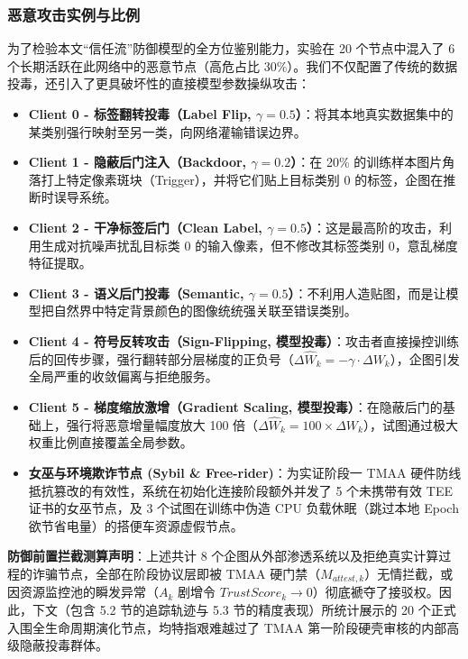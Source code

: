 \documentclass[11pt, a4paper, UTF8, fontset=fandol]{ctexart}
\begin{document}
\subsubsection{恶意攻击实例与比例}
为了检验本文“信任流”防御模型的全方位鉴别能力，实验在 20 个节点中混入了 6 个长期活跃在此网络中的恶意节点（高危占比 30\%）。我们不仅配置了传统的数据投毒，还引入了更具破坏性的直接模型参数操纵攻击：
\begin{itemize}
    \item \textbf{Client 0 - 标签翻转投毒（Label Flip, $\gamma=0.5$）}：将其本地真实数据集中的某类别强行映射至另一类，向网络灌输错误边界。
    \item \textbf{Client 1 - 隐蔽后门注入（Backdoor, $\gamma=0.2$）}：在 20\% 的训练样本图片角落打上特定像素斑块（Trigger），并将它们贴上目标类别 $0$ 的标签，企图在推断时误导系统。
    \item \textbf{Client 2 - 干净标签后门（Clean Label, $\gamma=0.5$）}：这是最高阶的攻击，利用生成对抗噪声扰乱目标类 $0$ 的输入像素，但不修改其标签类别 0，意乱梯度特征提取。
    \item \textbf{Client 3 - 语义后门投毒（Semantic, $\gamma=0.5$）}：不利用人造贴图，而是让模型把自然界中特定背景颜色的图像统统强关联至错误类别。
    \item \textbf{Client 4 - 符号反转攻击（Sign-Flipping, 模型投毒）}：攻击者直接操控训练后的回传步骤，强行翻转部分层梯度的正负号（$\Delta \widehat{W}_k = - \gamma \cdot \Delta W_k$），企图引发全局严重的收敛偏离与拒绝服务。
    \item \textbf{Client 5 - 梯度缩放激增（Gradient Scaling, 模型投毒）}：在隐蔽后门的基础上，强行将恶意增量幅度放大 100 倍（$\Delta \widehat{W}_k = 100 \times \Delta W_k$），试图通过极大权重比例直接覆盖全局参数。
    \item \textbf{女巫与环境欺诈节点 (Sybil \& Free-rider)}：为实证阶段一 TMAA 硬件防线抵抗篡改的有效性，系统在初始化连接阶段额外并发了 5 个未携带有效 TEE 证书的女巫节点，及 3 个试图在训练中伪造 CPU 负载休眠（跳过本地 Epoch 欲节省电量）的搭便车资源虚假节点。
\end{itemize}

\textbf{防御前置拦截测算声明}：上述共计 8 个企图从外部渗透系统以及拒绝真实计算过程的诈骗节点，全部在阶段协议层即被 TMAA 硬门禁（$M_{attest,k}$）无情拦截，或因资源监控池的瞬发异常（$A_k$ 剧增令 $TrustScore_k \to 0$）彻底褫夺了接驳权。因此，下文（包含 5.2 节的追踪轨迹与 5.3 节的精度表现）所统计展示的 20 个正式入围全生命周期演化节点，均特指艰难越过了 TMAA 第一阶段硬壳审核的内部高级隐蔽投毒群体。
\end{document}
